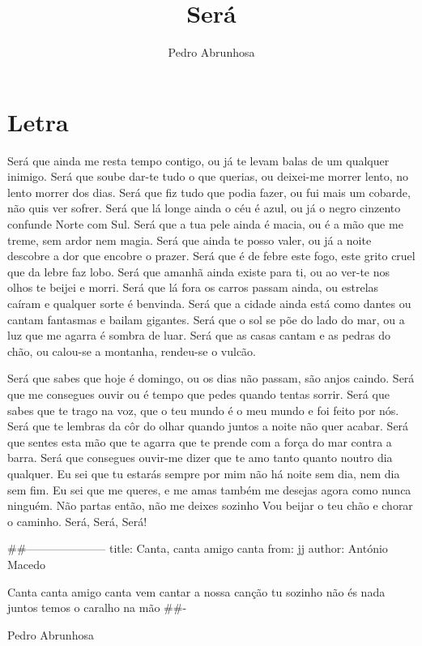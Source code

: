 \documentclass{article}
\author{Pedro Abrunhosa}
\title{Será}
\begin{document}
\maketitle
\section{Letra}
Será que ainda me resta tempo
contigo,
ou já te levam balas de um qualquer
inimigo.
Será que soube dar-te tudo o que
querias,
ou deixei-me morrer lento, no lento
morrer dos dias.
Será que fiz tudo que podia fazer,
ou fui mais um cobarde, não quis ver
sofrer.
Será que lá longe ainda o céu é azul,
ou já o negro cinzento confunde Norte
com Sul.
Será que a tua pele ainda é macia,
ou é a mão que me treme, sem ardor
nem magia.
Será que ainda te posso valer,
ou já a noite descobre a dor que
encobre o prazer.
Será que é de febre este fogo,
este grito cruel que da lebre faz lobo.
Será que amanhã ainda existe para ti,
ou ao ver-te nos olhos te beijei e
morri.
Será que lá fora os carros passam
ainda,
ou estrelas caíram e qualquer sorte é
benvinda.
Será que a cidade ainda está como
dantes
ou cantam fantasmas e bailam
gigantes.
Será que o sol se põe do lado do mar,
ou a luz que me agarra é sombra de
luar.
Será que as casas cantam e as pedras
do chão,
ou calou-se a montanha, rendeu-se o
vulcão.

Será que sabes que hoje é domingo,
ou os dias não passam, são anjos
caindo.
Será que me consegues ouvir
ou é tempo que pedes quando tentas
sorrir.
Será que sabes que te trago na voz,
que o teu mundo é o meu mundo e foi
feito por nós.
Será que te lembras da côr do olhar
quando juntos a noite não quer acabar.
Será que sentes esta mão que te agarra
que te prende com a força do mar
contra a barra.
Será que consegues ouvir-me dizer
que te amo tanto quanto noutro dia
qualquer.
Eu sei que tu estarás sempre por mim
não há noite sem dia, nem dia sem fim.
Eu sei que me queres, e me amas
também
me desejas agora como nunca
ninguém.
Não partas então, não me deixes
sozinho
Vou beijar o teu chão e chorar o
caminho.
Será,
Será,
Será!

##---------------------
title: Canta, canta amigo canta
from: jj
author: António Macedo

Canta canta amigo canta
vem cantar a nossa canção
tu sozinho não és nada
juntos temos o caralho na mão
##-
\begin{flushleft}
Pedro Abrunhosa 
\end{flushleft}
\end{document}

